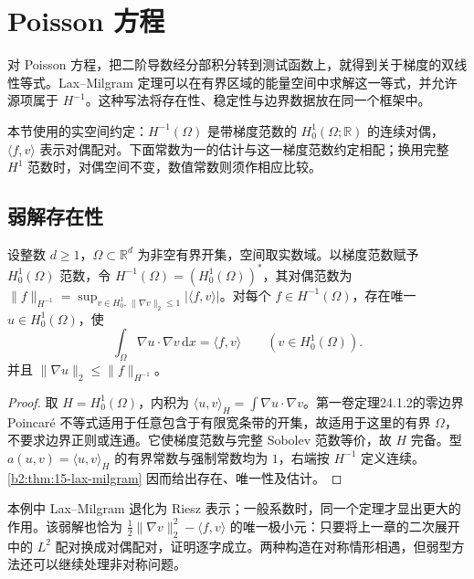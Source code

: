 \section{Poisson 方程}
\label{b2:sec:1503}

对 Poisson 方程，把二阶导数经分部积分转到测试函数上，就得到关于梯度的双线性等式。Lax--Milgram 定理可以在有界区域的能量空间中求解这一等式，并允许源项属于 \(H^{-1}\)。这种写法将存在性、稳定性与边界数据放在同一个框架中。

本节使用的实空间约定：\(H^{-1}(\Omega)\) 是带梯度范数的 \(H_0^1(\Omega;\mathbb R)\) 的连续对偶，\(\langle f,v\rangle\) 表示对偶配对。下面常数为一的估计与这一梯度范数约定相配；换用完整 \(H^1\) 范数时，对偶空间不变，数值常数则须作相应比较。

\subsection{弱解存在性}
\label{b2:subsec:150301}

\begin{theorem}
\label{b2:thm:15-poisson-existence}
设整数 \(d\geq1\)，\(\Omega\subset\mathbb R^d\) 为非空有界开集，空间取实数域。以梯度范数赋予 \(H_0^1(\Omega)\) 范数，令 \(H^{-1}(\Omega)=(H_0^1(\Omega))^*\)，其对偶范数为 \(\|f\|_{H^{-1}}=\sup_{v\in H_0^1,\,\|\nabla v\|_2\leq1}|\langle f,v\rangle|\)。对每个 \(f\in H^{-1}(\Omega)\)，存在唯一 \(u\in H_0^1(\Omega)\)，使
\[\int_\Omega\nabla u\cdot\nabla v\,\mathrm dx=\langle f,v\rangle
 \qquad(v\in H_0^1(\Omega)).\]
并且 \(\lVert\nabla u\rVert_2\le\lVert f\rVert_{H^{-1}}\)。
\end{theorem}
\begin{proof}
取 \(H=H_0^1(\Omega)\)，内积为 \(\langle u,v\rangle_H=\int\nabla u\cdot\nabla v\)。第一卷定理24.1.2的零边界 Poincaré 不等式适用于任意包含于有限宽条带的开集，故适用于这里的有界 \(\Omega\)，不要求边界正则或连通。它使梯度范数与完整 Sobolev 范数等价，故 \(H\) 完备。型 \(a(u,v)=\langle u,v\rangle_H\) 的有界常数与强制常数均为 \(1\)，右端按 \(H^{-1}\) 定义连续。\cref{b2:thm:15-lax-milgram} 因而给出存在、唯一性及估计。
\end{proof}

本例中 Lax--Milgram 退化为 Riesz 表示；一般系数时，同一个定理才显出更大的作用。该弱解也恰为 \(\tfrac12\lVert\nabla v\rVert_2^2-\langle f,v\rangle\) 的唯一极小元：只要将上一章的二次展开中的 \(L^2\) 配对换成对偶配对，证明逐字成立。两种构造在对称情形相遇，但弱型方法还可以继续处理非对称问题。

